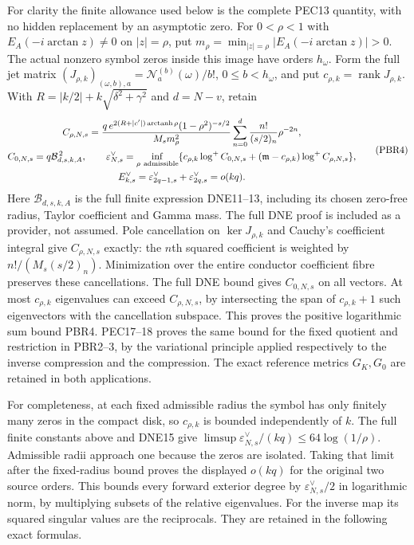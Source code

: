 \documentclass[11pt,a4paper]{article}
\begin{document}
For clarity the finite allowance used below is the complete PEC13
quantity, with no hidden replacement by an asymptotic zero.
For $0<\rho<1$ with $E_A(-i\arctan z)\ne0$ on $|z|=\rho$, put
$m_\rho=\min_{|z|=\rho}|E_A(-i\arctan z)|>0$.
The actual nonzero symbol zeros inside this image have orders
$h_\omega$. Form the full jet matrix
$(J_{\rho,k})_{(\omega,b),a}=\mathcal N_a^{(b)}(\omega)/b!$,
$0\le b<h_\omega$, and put $c_{\rho,k}=\operatorname{rank}J_{\rho,k}$.
With $R=|k/2|+k\sqrt{\delta^2+\gamma^2}$ and $d=N-v$, retain
\[
\begin{gathered}
 C_{\rho,N,s}=
 \frac{q\,e^{2(R+|c'|)\operatorname{arctanh}\rho}
 (1-\rho^2)^{-s/2}}{M_sm_\rho^2}
 \sum_{n=0}^{d}\frac{n!}{(s/2)_n}\rho^{-2n},\\
 C_{0,N,s}=q\mathcal B_{d,s,k,A}^{\,2},\qquad
 \varepsilon_{N,s}^{\vee}
 =\inf_{\rho\ {\rm admissible}}
 \{c_{\rho,k}\log^+C_{0,N,s}
       +(\mathfrak m-c_{\rho,k})\log^+C_{\rho,N,s}\},\\
 E_{k,s}^{\vee}=\varepsilon_{2q-1,s}^{\vee}
                       +\varepsilon_{2q,s}^{\vee}=o(kq).
\end{gathered}\tag{PBR4}
\]
Here $\mathcal B_{d,s,k,A}$ is the full finite expression DNE11--13,
including its chosen zero-free radius, Taylor coefficient and Gamma
mass. The full DNE proof is included as a provider, not assumed.
Pole cancellation on $\ker J_{\rho,k}$ and Cauchy's coefficient
integral give $C_{\rho,N,s}$ exactly: the $n$th squared coefficient
is weighted by $n!/(M_s(s/2)_n)$. Minimization over the entire
conductor coefficient fibre preserves these cancellations. The
full DNE bound gives $C_{0,N,s}$ on all vectors. At most
$c_{\rho,k}$ eigenvalues can exceed $C_{\rho,N,s}$, by intersecting
the span of $c_{\rho,k}+1$ such eigenvectors with the cancellation
subspace. This proves the positive logarithmic sum bound PBR4.
PEC17--18 proves the same bound for the fixed quotient and restriction
in PBR2--3, by the variational principle applied respectively to the
inverse compression and the compression. The exact reference metrics
$G_K,G_0$ are retained in both applications.

For completeness, at each fixed admissible radius the symbol has
only finitely many zeros in the compact disk, so $c_{\rho,k}$ is
bounded independently of $k$. The full finite constants above and
DNE15 give
$\limsup\varepsilon_{N,s}^{\vee}/(kq)\le64\log(1/\rho)$.
Admissible radii approach one because the zeros are isolated.
Taking that limit after the fixed-radius bound proves the displayed
$o(kq)$ for the original two source orders. This bounds every
forward exterior degree by $\varepsilon_{N,s}^{\vee}/2$ in logarithmic
norm, by multiplying subsets of the relative eigenvalues.
For the inverse map its squared singular values are the reciprocals.
They are retained in the following exact formulas.
\end{document}
